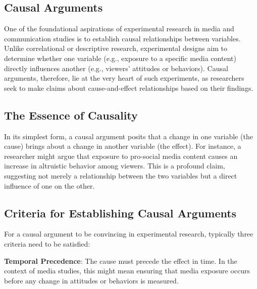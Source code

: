 \documentclass[
  b5paper]{book}
\begin{document}
\hypertarget{causal-arguments}{%
\subsection*{Causal Arguments}\label{causal-arguments}}

One of the foundational aspirations of experimental research in media and communication studies is to establish causal relationships between variables. Unlike correlational or descriptive research, experimental designs aim to determine whether one variable (e.g., exposure to a specific media content) directly influences another (e.g., viewers' attitudes or behaviors). Causal arguments, therefore, lie at the very heart of such experiments, as researchers seek to make claims about cause-and-effect relationships based on their findings.

\hypertarget{the-essence-of-causality}{%
\subsection*{The Essence of Causality}\label{the-essence-of-causality}}

In its simplest form, a causal argument posits that a change in one variable (the cause) brings about a change in another variable (the effect). For instance, a researcher might argue that exposure to pro-social media content causes an increase in altruistic behavior among viewers. This is a profound claim, suggesting not merely a relationship between the two variables but a direct influence of one on the other.

\hypertarget{criteria-for-establishing-causal-arguments}{%
\subsection*{Criteria for Establishing Causal Arguments}\label{criteria-for-establishing-causal-arguments}}

For a causal argument to be convincing in experimental research, typically three criteria need to be satisfied:

\textbf{Temporal Precedence}: The cause must precede the effect in time. In the context of media studies, this might mean ensuring that media exposure occurs before any change in attitudes or behaviors is measured.
\end{document}
